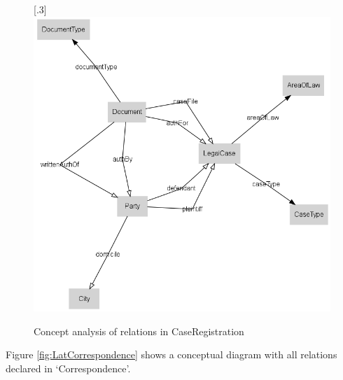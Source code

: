 \documentclass[10pt,a4paper]{report}              %
\theoremstyle{plain}\theorembodyfont{\rmfamily}\newtheorem{definition}{Definition}[section]
\theoremstyle{plain}\theorembodyfont{\rmfamily}\newtheorem{designrule}[definition]{Requirement}
\begin{document}
\begin{figure}[htb]
\begin{center}
\scalebox{.3}[.3]{\includegraphics{LatCaseRegistration}}
\caption{Concept analysis of relations in CaseRegistration}
\label{fig:LatCaseRegistration}
\end{center}
\end{figure}
Figure \ref{fig:LatCorrespondence} shows a conceptual diagram with all relations declared in `Correspondence'.
\end{document}
